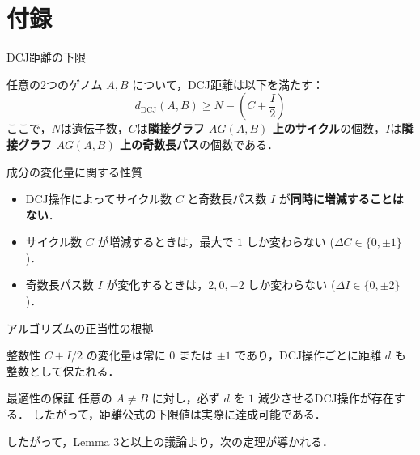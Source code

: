 \appendix
\section*{付録}

\begin{frame}{DCJ距離の下限}
    \begin{lemma}[DCJ距離の下限]
        任意の2つのゲノム $A, B$ について，DCJ距離は以下を満たす：
        \[
            d_{\mathrm{DCJ}}(A,B) \ge N - \left( C + \frac{I}{2} \right)
        \]
        ここで，$N$は遺伝子数，$C$は\textbf{隣接グラフ $AG(A,B)$ 上のサイクル}の個数，$I$は\textbf{隣接グラフ $AG(A,B)$ 上の奇数長パス}の個数である．
    \end{lemma}

    \begin{alertblock}{成分の変化量に関する性質}
        \begin{itemize}
            \item DCJ操作によってサイクル数 $C$ と奇数長パス数 $I$ が\textbf{同時に増減することはない}．
            \item サイクル数 $C$ が増減するときは，最大で $1$ しか変わらない ($\Delta C \in \{0, \pm 1\}$)．
            \item 奇数長パス数 $I$ が変化するときは，$2, 0, -2$ しか変わらない ($\Delta I \in \{0, \pm 2\}$)．
        \end{itemize}
    \end{alertblock}
\end{frame}


\begin{frame}{アルゴリズムの正当性の根拠}
    \begin{block}{整数性}
        $C + I/2$ の変化量は常に $0$ または $\pm 1$ であり，DCJ操作ごとに距離 $d$ も整数として保たれる．
    \end{block}

    \begin{block}{最適性の保証}
        任意の $A \neq B$ に対し，必ず $d$ を $1$ 減少させるDCJ操作が存在する．
        したがって，距離公式の下限値は実際に達成可能である．
    \end{block}

    したがって，Lemma 3と以上の議論より，次の定理が導かれる．
\end{frame}

